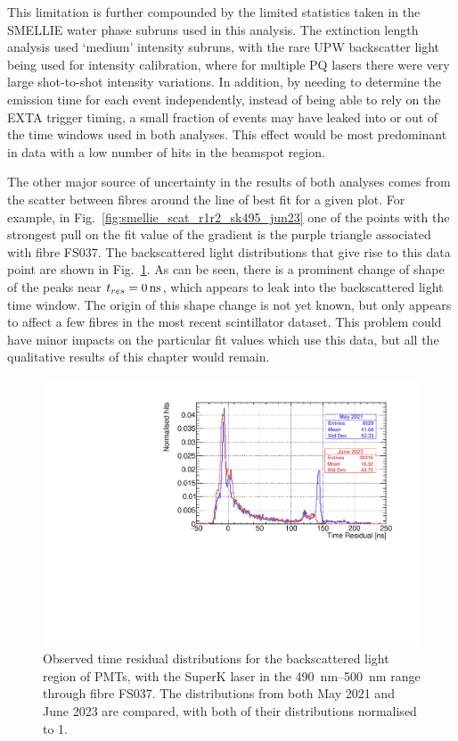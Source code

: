 This limitation is further compounded by the limited statistics taken in the SMELLIE water phase subruns used in this analysis. The extinction length analysis used `medium' intensity subruns, with the rare UPW backscatter light being used for intensity calibration, where for multiple PQ lasers there were very large shot-to-shot intensity variations. In addition, by needing to determine the emission time for each event independently, instead of being able to rely on the EXTA trigger timing, a small fraction of events may have leaked into or out of the time windows used in both analyses. This effect would be most predominant in data with a low number of hits in the beamspot region.

The other major source of uncertainty in the results of both analyses comes from the scatter between fibres around the line of best fit for a given plot. For example, in Fig.~\ref{fig:smellie_scat_r1r2_sk495_jun23} one of the points with the strongest pull on the fit value of the gradient is the purple triangle associated with fibre FS037. The backscattered light distributions that give rise to this data point are shown in Fig.~\ref{fig:smellie_FS037_backscat_tres_comparison}. As can be seen, there is a prominent change of shape of the peaks near $\tres{} = \SI{0}{\ns}$, which appears to leak into the backscattered light time window. The origin of this shape change is not yet known, but only appears to affect a few fibres in the most recent scintillator dataset. %
This problem could have minor impacts on the particular fit values which use this data, but all the qualitative results of this chapter would remain. %

\begin{figure}
    \centering
    \includegraphics[width=\textwidth]{5_SMELLIEAnalysis/images/FS037_superK_490_500_May2021_vs_Jun2023_back_tres.pdf}
    \caption[Observed time residual distributions for the backscattered light region for FS037, comparing May 2021 to June 2023 data]
    {Observed time residual distributions for the backscattered light region of PMTs, with the SuperK laser in the \SIrange{490}{500}{\nm} range through fibre FS037. The distributions from both May 2021 and June 2023 are compared, with both of their distributions normalised to 1.}
    \label{fig:smellie_FS037_backscat_tres_comparison}
\end{figure}

